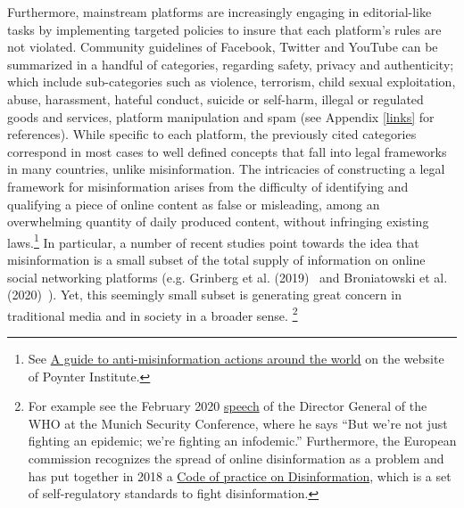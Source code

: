 \documentclass{article}
\begin{document}
Furthermore, mainstream platforms are increasingly engaging in editorial-like tasks by implementing targeted policies to insure that each platform's rules are not violated. Community guidelines of Facebook, Twitter and YouTube can be summarized in a handful of categories, regarding safety, privacy and authenticity; which include sub-categories such as violence, terrorism, child sexual exploitation, abuse, harassment, hateful conduct, suicide or self-harm, illegal or regulated goods and services, platform manipulation and spam (see Appendix \ref{links} for references). While specific to each platform, the previously cited categories correspond in most cases to well defined concepts that fall into legal frameworks in many countries, unlike misinformation. The intricacies of constructing a legal framework for misinformation arises from the difficulty of identifying and qualifying a piece of online content as false or misleading, among an overwhelming quantity of daily produced content, without infringing existing laws.\footnote{See \href{https://www.poynter.org/ifcn/anti-misinformation-actions/}{A guide to anti-misinformation actions around the world} on the website of Poynter Institute.} In particular, a number of recent studies point towards the idea that misinformation is a small subset of the total supply of information on online social networking platforms (e.g. Grinberg et al. (2019)~\cite{grinberg} and Broniatowski et al. (2020)~\cite{broniatowski}). Yet, this seemingly small subset is generating great concern in traditional media and in society in a broader sense. \footnote{For example see the February 2020 \href{https://www.who.int/director-general/speeches/detail/munich-security-conference}{speech} of the Director General of the WHO at the Munich Security Conference, where he says ``But we’re not just fighting an epidemic; we’re fighting an infodemic.'' Furthermore, the European commission recognizes the spread of online disinformation as a problem and has put together in 2018 a \href{https://digital-strategy.ec.europa.eu/en/policies/code-practice-disinformation}{Code of practice on Disinformation}, which is a set of self-regulatory standards to fight disinformation.}

\smallskip
\end{document}
